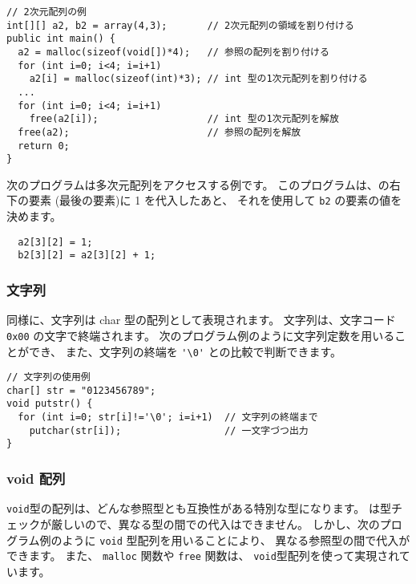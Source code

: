 
\begin{mylist}
\begin{verbatim}
// 2次元配列の例
int[][] a2, b2 = array(4,3);       // 2次元配列の領域を割り付ける
public int main() {
  a2 = malloc(sizeof(void[])*4);   // 参照の配列を割り付ける
  for (int i=0; i<4; i=i+1)
    a2[i] = malloc(sizeof(int)*3); // int 型の1次元配列を割り付ける
  ...
  for (int i=0; i<4; i=i+1)
    free(a2[i]);                   // int 型の1次元配列を解放
  free(a2);                        // 参照の配列を解放
  return 0;
}
\end{verbatim}
\end{mylist}

次のプログラムは多次元配列をアクセスする例です。
このプログラムは、の右下の要素
(最後の要素)に 1 を代入したあと、
それを使用して \verb/b2/ の要素の値を決めます。

\begin{mylist}
\begin{verbatim}
  a2[3][2] = 1;
  b2[3][2] = a2[3][2] + 1;
\end{verbatim}
\end{mylist}

\subsubsection{文字列}

\cl 同様に、文字列は char 型の配列として表現されます。
文字列は、文字コード \verb/0x00/ の文字で終端されます。
次のプログラム例のように文字列定数を用いることができ、
また、文字列の終端を \verb/'\0'/ との比較で判断できます。

\begin{mylist}
\begin{verbatim}
// 文字列の使用例
char[] str = "0123456789";
void putstr() {
  for (int i=0; str[i]!='\0'; i=i+1)  // 文字列の終端まで
    putchar(str[i]);                  // 一文字づつ出力
}
\end{verbatim}
\end{mylist}

\subsubsection{ void 配列}

\verb/void/型の配列は、どんな参照型とも互換性がある特別な型になります。
\cmml は型チェックが厳しいので、異なる型の間での代入はできません。
しかし、次のプログラム例のように \verb/void/ 型配列を用いることにより、
異なる参照型の間で代入ができます。
また、 \verb/malloc/ 関数や \verb/free/ 関数は、
\verb/void/型配列を使って実現されています。

